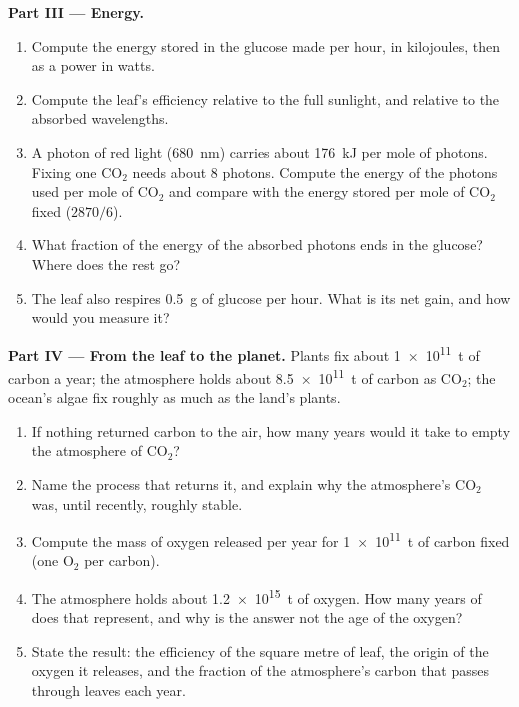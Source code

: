\begin{problem}
\medskip
\noindent\textbf{Part III --- Energy.}
\begin{enumerate}[resume]
  \item Compute the energy stored in the glucose made per hour, in
        kilojoules, then as a power in watts.
  \item Compute the leaf's efficiency relative to the full sunlight,
        and relative to the absorbed wavelengths.
  \item A photon of red light (\qty{680}{nm}) carries about
        \qty{176}{kJ} per mole of photons. Fixing one $\mathrm{CO_2}$
        needs about 8 photons. Compute the energy of the photons used
        per mole of $\mathrm{CO_2}$ and compare with the energy stored
        per mole of $\mathrm{CO_2}$ fixed ($2870/6$).
  \item What fraction of the energy of the absorbed photons ends in the
        glucose? Where does the rest go?
  \item The leaf also respires \qty{0.5}{g} of glucose per hour. What
        is its net gain, and how would you measure it?
\end{enumerate}

\medskip
\noindent\textbf{Part IV --- From the leaf to the planet.}
Plants fix about \qty{1e11}{t} of carbon a year; the atmosphere holds
about \qty{8.5e11}{t} of carbon as $\mathrm{CO_2}$; the ocean's algae
fix roughly as much as the land's plants.
\begin{enumerate}[resume]
  \item If nothing returned carbon to the air, how many years would it
        take  to empty the atmosphere of $\mathrm{CO_2}$?
  \item Name the process that returns it, and explain why the
        atmosphere's $\mathrm{CO_2}$ was, until recently, roughly
        stable.
  \item Compute the mass of oxygen released per year for \qty{1e11}{t}
        of carbon fixed (one $\mathrm{O_2}$ per carbon).
  \item The atmosphere holds about \qty{1.2e15}{t} of oxygen. How
        many years of  does that represent, and why is
        the answer not the age of the oxygen?
  \item State the result: the efficiency of the square metre of leaf,
        the origin of the oxygen it releases, and the fraction of the
        atmosphere's carbon that passes through leaves each year.
\end{enumerate}
\end{problem}
